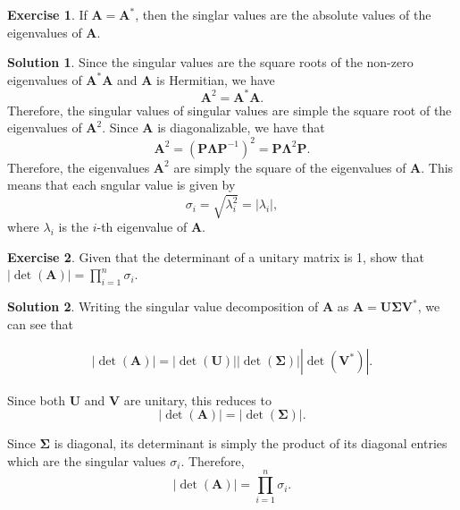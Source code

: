 \documentclass[12pt]{article}
\newcommand{\abs}[1]{ \left| #1 \right| }
\renewcommand{\vec}[1]{\mathbf{#1}}
\theoremstyle{definition}
\newtheorem{exer}{Exercise}
\newtheorem{sol}{Solution}
\theoremstyle{remark}
\begin{document}
\begin{exer}
    If $\vec{A}=\vec{A}^*$, then the singlar values are the absolute values of the eigenvalues of $\vec{A}$.
\end{exer}

\begin{sol}
    Since the singular values are the square roots of the non-zero eigenvalues of $\vec{A}^*\vec{A}$ and $\vec{A}$ is Hermitian, we have 
    \begin{equation}
        \vec{A}^2=\vec{A}^*\vec{A}.
    \end{equation}
Therefore, the singular values of singular values are simple the square root of the eigenvalues of $\vec{A}^2$. Since $\vec{A}$ is diagonalizable, we have that
\begin{equation}
    \vec{A}^2 = (\vec{P}\vec{\Lambda}\vec{P}^{-1})^2 = \vec{P}\vec{\Lambda}^2\vec{P}.
\end{equation}
Therefore, the eigenvalues $\vec{A}^2$ are simply the square of the eigenvalues of $\vec{A}$. This means that each sngular value is given by
\begin{equation}
    \sigma_i = \sqrt{ \lambda_i^2 } = \abs{\lambda_i},
\end{equation}
where $\lambda_i$ is the $i$-th eigenvalue of $\vec{A}$.
\end{sol}

\begin{exer}
    Given that the determinant of a unitary matrix is 1, show that $\abs{\det (\vec{A})} = \prod_{i=1}^n \sigma_i$.
\end{exer}

\begin{sol}
    Writing the singular value decomposition of $\vec{A}$ as $\vec{A} = \vec{U}\vec{\Sigma}\vec{V}^*$, we can see that

    \begin{align}
    \abs{\det(\vec{A})} = \abs{\det(\vec{U})} \abs{\det(\vec{\Sigma})} \abs{\det(\vec{V}^*)}.   
    \end{align}

Since both $\vec{U}$ and $\vec{V}$ are unitary, this reduces to
\begin{equation}
    \abs{\det(\vec{A})} = \abs{\det(\vec{\Sigma})}. 
\end{equation}

Since $\vec{\Sigma}$ is diagonal, its determinant is simply the product of its diagonal entries which are the singular values $\sigma_i$. Therefore,
\begin{equation}
    \abs{\det(\vec{A})} = \prod_{i=1}^{n} \sigma_i. 
\end{equation}
\end{sol}
\end{document}
